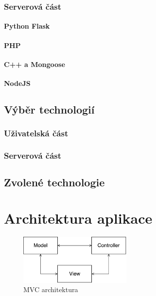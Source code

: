 \subsection{Serverová část}
\subsubsection*{Python Flask}
\subsubsection*{PHP}
\subsubsection*{C++ a Mongoose}
\subsubsection*{NodeJS}





\section{Výběr technologií}
\subsection{Uživatelská část}

\subsection{Serverová část}

\section{Zvolené technologie}

\chapter{Architektura aplikace}
\label{architektura}

\begin{figure}[h]
    \centering
    \includegraphics[width=0.5\textwidth]{fig/mvc.pdf}
    \caption{MVC architektura} \label{fig:mvc}
  
\end{figure}


